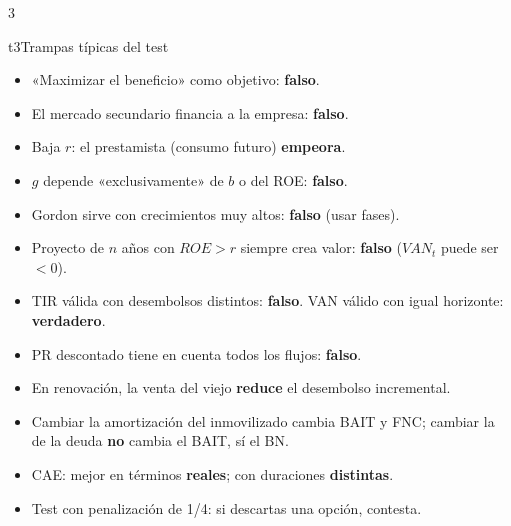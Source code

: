\documentclass[9pt]{extarticle}
\begin{document}
\begin{multicols*}{3}
\columnbreak
\begin{bloque}{t3}{Trampas típicas del test}
\begin{itemize}
\item «Maximizar el beneficio» como objetivo: \textbf{falso}.
\item El mercado secundario financia a la empresa: \textbf{falso}.
\item Baja $r$: el prestamista (consumo futuro) \textbf{empeora}.
\item $g$ depende «exclusivamente» de $b$ o del ROE: \textbf{falso}.
\item Gordon sirve con crecimientos muy altos: \textbf{falso} (usar fases).
\item Proyecto de $n$ años con $ROE>r$ siempre crea valor: \textbf{falso} ($VAN_t$ puede ser $<0$).
\item TIR válida con desembolsos distintos: \textbf{falso}. VAN válido con igual horizonte: \textbf{verdadero}.
\item PR descontado tiene en cuenta todos los flujos: \textbf{falso}.
\item En renovación, la venta del viejo \textbf{reduce} el desembolso incremental.
\item Cambiar la amortización del inmovilizado cambia BAIT y FNC; cambiar la de la deuda \textbf{no} cambia el BAIT, sí el BN.
\item CAE: mejor en términos \textbf{reales}; con duraciones \textbf{distintas}.
\item Test con penalización de 1/4: si descartas una opción, contesta.
\end{itemize}
\end{bloque}

\end{multicols*}
\end{document}
